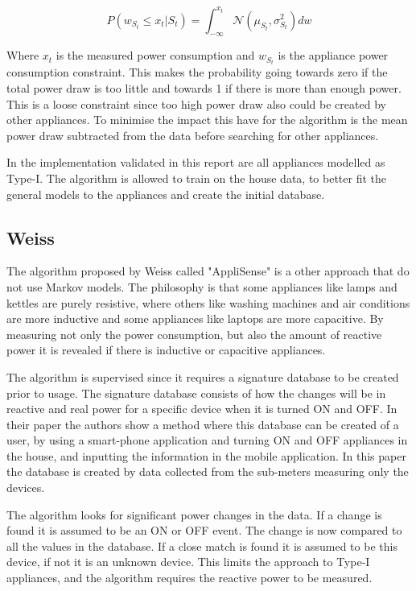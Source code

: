 \begin{equation}
	P(w_{S_t} \leq x_t | S_t ) = \int_{-\infty}^{x_t}  \mathcal{N}( \mu_{S_t} , \sigma_{S_t}^2 ) dw
	\label{EQ:PCA}
\end{equation}

Where $x_t$ is the measured power consumption and $w_{S_t}$ is the appliance power consumption constraint. This makes the probability going towards zero if the total power draw is too little and towards 1 if there is more than enough power. This is a loose constraint since too high power draw also could be created by other appliances. To minimise the impact this have for the algorithm is the mean power draw subtracted from the data before searching for other appliances. 

In the implementation validated in this report are all appliances modelled as Type-I. The algorithm is allowed to train on the house data, to better fit the general models to the appliances and create the initial database.

\subsection{Weiss}
The algorithm proposed by Weiss called "AppliSense" is a other approach that do not use Markov models\citep{RefWorks:23}. The philosophy is that some appliances like lamps and kettles are purely resistive, where others like washing machines and air conditions are more inductive and some appliances like laptops are more capacitive. By measuring not only the power consumption, but also the amount of reactive power it is revealed if there is inductive or capacitive appliances.

The algorithm is supervised since it requires a signature database to be created prior to usage. The signature database consists of how the changes will be in reactive and real power for a specific device when it is turned ON and OFF. In their paper the authors show a method where this database can be created of a user, by using a smart-phone application and turning ON and OFF appliances in the house, and inputting the information in the mobile application\citep{RefWorks:23}. In this paper the database is created by data collected from the sub-meters measuring only the devices.  

The algorithm looks for significant power changes in the data. If a change is found it is assumed to be an ON or OFF event. The change is now compared to all the values in the database. If a close match is found it is assumed to be this device, if not it is an unknown device. This limits the approach to Type-I appliances, and the algorithm requires the reactive power to be measured. 

